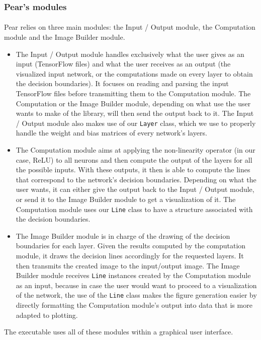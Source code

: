 \documentclass[a4paper]{article}
\begin{document}
\subsubsection{Pear's modules}
\paragraph{}Pear relies on three main modules: the Input / Output module, the Computation module and the Image Builder module.
\begin{itemize}
\item The Input / Output module handles exclusively what the user gives as an input (TensorFlow files) and what the user receives as an output (the visualized input network, or the computations made on every layer to obtain the decision boundaries). It focuses on reading and parsing the input TensorFlow files before transmitting them to the Computation module. The Computation or the Image Builder module, depending on what use the user wants to make of the library, will then send the output back to it. The Input / Output module also makes use of our \verb?Layer? class, which we use to properly handle the weight and bias matrices of every network's layers.
\item The Computation module aims at applying the non-linearity operator (in our case, ReLU) to all neurons and then compute the output of the layers for all the possible inputs. With these outputs, it then is able to compute the lines that correspond to the network's decision boundaries. Depending on what the user wants, it can either give the output back to the Input / Output module, or send it to the Image Builder module to get a visualization of it. The Computation module uses our \verb?Line? class to have a structure associated with the decision boundaries. 
\item The Image Builder module is in charge of the drawing of the decision boundaries for each layer. Given the results computed by the computation module, it draws the decision lines accordingly for the requested layers. It then transmits the created image to the input/output image. The Image Builder module receives \verb?Line? instances created by the Computation module as an input, because in case the user would want to proceed to a visualization of the network, the use of the \verb?Line? class makes the figure generation easier by directly formatting the Computation module's output into data that is more adapted to plotting.
\end{itemize}
The executable uses all of these modules within a graphical user interface.
\end{document}

